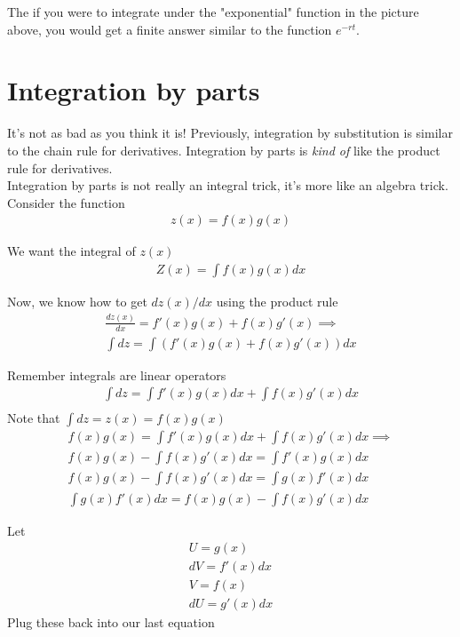 \documentclass{article}
\begin{document}
The if you were to integrate under the "exponential" function in the picture above, you would get a finite answer similar to the function $e^{-rt}$. \\

\section{Integration by parts}
It's not as bad as you think it is! Previously, integration by substitution is similar to the chain rule for derivatives. Integration by parts is \textit{kind of} like the product rule for derivatives. \\

Integration by parts is not really an integral trick, it's more like an algebra trick. \\

Consider the function 
\begin{align}
    z(x) = f(x) g(x)
\end{align}

We want the integral of $z(x)$ 
\begin{align}
    Z(x) = \int f(x)g(x) dx 
\end{align}

Now, we know how to get $dz(x) /dx$ using the product rule
\begin{align}
    \frac{dz(x)}{dx} = f'(x) g(x) + f(x) g'(x) \implies\\
    \int dz = \int (f'(x) g(x) + f(x) g'(x)) dx 
\end{align}

Remember integrals are linear operators
\begin{align}
    \int dz = \int f'(x) g(x) dx + \int f(x) g'(x) dx\\
\end{align}
Note that $\int dz = z(x) = f(x) g(x)$
\begin{align}
    f(x) g(x) = \int f'(x) g(x) dx + \int f(x) g'(x) dx \implies \\
    f(x) g(x) - \int f(x) g'(x) dx = \int f'(x) g(x) dx \\
    f(x) g(x) - \int f(x) g'(x) dx = \int g(x) f'(x) dx  \\
    \int g(x) f'(x) dx = f(x) g(x) - \int f(x) g'(x) dx
\end{align}

Let 
\begin{align}
    U = g(x) \\
    dV = f'(x)dx \\
    V = f(x) \\
    dU = g'(x)dx
\end{align}
Plug these back into our last equation 
\end{document}
